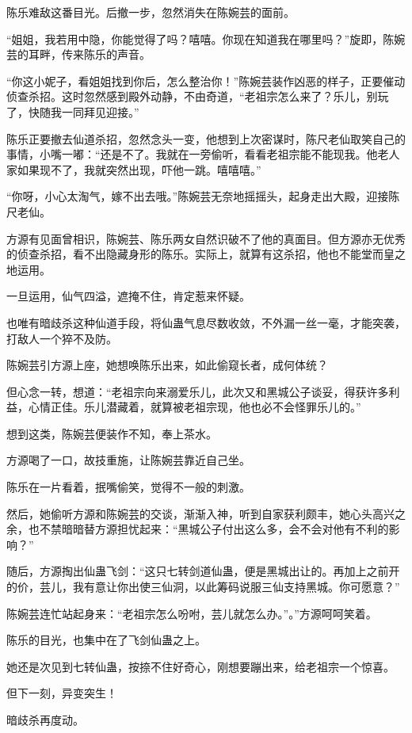 \begin{this_body}
陈乐难敌这番目光。后撤一步，忽然消失在陈婉芸的面前。

“姐姐，我若用中隐，你能觉得了吗？嘻嘻。你现在知道我在哪里吗？”旋即，陈婉芸的耳畔，传来陈乐的声音。

“你这小妮子，看姐姐找到你后，怎么整治你！”陈婉芸装作凶恶的样子，正要催动侦查杀招。这时忽然感到殿外动静，不由奇道，“老祖宗怎么来了？乐儿，别玩了，快随我一同拜见迎接。”

陈乐正要撤去仙道杀招，忽然念头一变，他想到上次密谋时，陈尺老仙取笑自己的事情，小嘴一嘟：“还是不了。我就在一旁偷听，看看老祖宗能不能现我。他老人家如果现不了，我就突然出现，吓他一跳。嘻嘻嘻。”

“你呀，小心太淘气，嫁不出去哦。”陈婉芸无奈地摇摇头，起身走出大殿，迎接陈尺老仙。

方源有见面曾相识，陈婉芸、陈乐两女自然识破不了他的真面目。但方源亦无优秀的侦查杀招，看不出隐藏身形的陈乐。实际上，就算有这杀招，他也不能堂而皇之地运用。

一旦运用，仙气四溢，遮掩不住，肯定惹来怀疑。

也唯有暗歧杀这种仙道手段，将仙蛊气息尽数收敛，不外漏一丝一毫，才能突袭，打敌人一个猝不及防。

陈婉芸引方源上座，她想唤陈乐出来，如此偷窥长者，成何体统？

但心念一转，想道：“老祖宗向来溺爱乐儿，此次又和黑城公子谈妥，得获许多利益，心情正佳。乐儿潜藏着，就算被老祖宗现，他也必不会怪罪乐儿的。”

想到这类，陈婉芸便装作不知，奉上茶水。

方源喝了一口，故技重施，让陈婉芸靠近自己坐。

陈乐在一片看着，抿嘴偷笑，觉得不一般的刺激。

然后，她偷听方源和陈婉芸的交谈，渐渐入神，听到自家获利颇丰，她心头高兴之余，也不禁暗暗替方源担忧起来：“黑城公子付出这么多，会不会对他有不利的影响？”

随后，方源掏出仙蛊飞剑：“这只七转剑道仙蛊，便是黑城出让的。再加上之前开的价，芸儿，我有意让你出使三仙洞，以此筹码说服三仙支持黑城。你可愿意？”

陈婉芸连忙站起身来：“老祖宗怎么吩咐，芸儿就怎么办。”。”方源呵呵笑着。

陈乐的目光，也集中在了飞剑仙蛊之上。

她还是次见到七转仙蛊，按捺不住好奇心，刚想要蹦出来，给老祖宗一个惊喜。

但下一刻，异变突生！

暗歧杀再度动。


\end{this_body}
